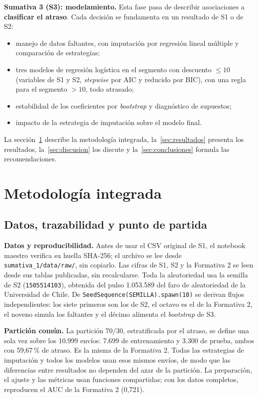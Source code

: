 \documentclass[11pt,a4paper]{article}
\newcommand{\codigo}[1]{{\small\texttt{#1}}}
\begin{document}
\textbf{Sumativa 3 (S3): modelamiento.} Esta fase pasa de describir asociaciones a \textbf{clasificar el atraso}. Cada decisión se fundamenta en un resultado de S1 o de S2:
\begin{itemize}
\item manejo de datos faltantes, con imputación por regresión lineal múltiple y comparación de estrategias;
\item tres modelos de regresión logística en el segmento con descuento $\le 10$ (variables de S1 y S2, \emph{stepwise} por AIC y reducido por BIC), con una regla para el segmento $> 10$, todo atrasado;
\item estabilidad de los coeficientes por \emph{bootstrap} y diagnóstico de supuestos;
\item impacto de la estrategia de imputación sobre el modelo final.
\end{itemize}
La sección~\ref{sec:metodologia} describe la metodología integrada, la~\ref{sec:resultados} presenta los resultados, la~\ref{sec:discusion} los discute y la~\ref{sec:conclusiones} formula las recomendaciones.

\section{Metodología integrada}\label{sec:metodologia}
\subsection{Datos, trazabilidad y punto de partida}\label{sec:datos}
\textbf{Datos y reproducibilidad.} Antes de usar el CSV original de S1, el notebook maestro verifica su huella SHA-256; el archivo se lee desde \codigo{sumativa\_1/data/raw/}, sin copiarlo. Las cifras de S1, S2 y la Formativa 2 se leen desde sus tablas publicadas, sin recalcularse. Toda la aleatoriedad usa la semilla de S2 (\codigo{1505514103}), obtenida del pulso 1.053.589 del faro de aleatoriedad de la Universidad de Chile. De \codigo{SeedSequence(SEMILLA).spawn(10)} se derivan flujos independientes: los siete primeros son los de S2, el octavo es el de la Formativa 2, el noveno simula los faltantes y el décimo alimenta el \emph{bootstrap} de S3.

\textbf{Partición común.} La partición 70/30, estratificada por el atraso, se define una sola vez sobre los 10.999 envíos: 7.699 de entrenamiento y 3.300 de prueba, ambos con 59,67\,\% de atraso. Es la misma de la Formativa 2. Todas las estrategias de imputación y todos los modelos usan esos mismos envíos, de modo que las diferencias entre resultados no dependen del azar de la partición. La preparación, el ajuste y las métricas usan funciones compartidas; con los datos completos, reproducen el AUC de la Formativa 2 (0,721).
\end{document}
